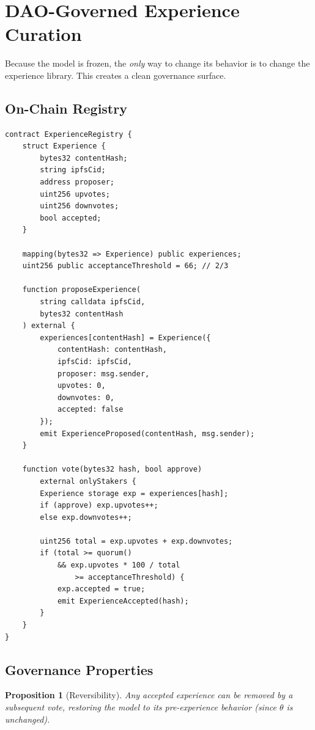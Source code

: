 \documentclass[11pt,letterpaper]{article}
\newtheorem{proposition}[theorem]{Proposition}
\begin{document}
\section{DAO-Governed Experience Curation}
\label{sec:dao}

Because the model is frozen, the \textit{only} way to change its behavior is to change the experience library.  This creates a clean governance surface.

\subsection{On-Chain Registry}

\begin{lstlisting}[language=Solidity,caption=Experience registry contract]
contract ExperienceRegistry {
    struct Experience {
        bytes32 contentHash;
        string ipfsCid;
        address proposer;
        uint256 upvotes;
        uint256 downvotes;
        bool accepted;
    }

    mapping(bytes32 => Experience) public experiences;
    uint256 public acceptanceThreshold = 66; // 2/3

    function proposeExperience(
        string calldata ipfsCid,
        bytes32 contentHash
    ) external {
        experiences[contentHash] = Experience({
            contentHash: contentHash,
            ipfsCid: ipfsCid,
            proposer: msg.sender,
            upvotes: 0,
            downvotes: 0,
            accepted: false
        });
        emit ExperienceProposed(contentHash, msg.sender);
    }

    function vote(bytes32 hash, bool approve)
        external onlyStakers {
        Experience storage exp = experiences[hash];
        if (approve) exp.upvotes++;
        else exp.downvotes++;

        uint256 total = exp.upvotes + exp.downvotes;
        if (total >= quorum()
            && exp.upvotes * 100 / total
                >= acceptanceThreshold) {
            exp.accepted = true;
            emit ExperienceAccepted(hash);
        }
    }
}
\end{lstlisting}

\subsection{Governance Properties}

\begin{proposition}[Reversibility]
Any accepted experience can be removed by a subsequent vote, restoring the model to its pre-experience behavior (since $\theta$ is unchanged).
\end{proposition}
\end{document}
